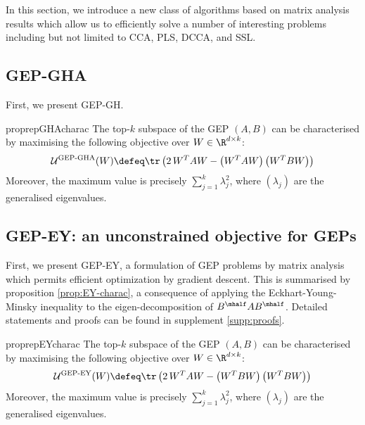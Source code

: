 In this section, we introduce a new class of algorithms based on matrix analysis results which allow us to efficiently solve a number of interesting problems including but not limited to CCA, PLS, DCCA, and SSL.

\subsection{GEP-GHA}
First, we present GEP-GH.

\begin{restatable}{proprep}{GHAcharac}
    \label{prop:GHA-charac}
    The top-$k$ subspace of the GEP $(A,B)$ can be characterised by maximising the following objective over $W \in \R^{d \times k}$:
    \begin{align}
        \mathcal{U}^\text{GEP-GHA}(W) \defeq \tr \left( 2\, W^T A W - \left(W^T A W\right) \left(W^T B W\right) \right)
    \end{align}
    Moreover, the maximum value is precisely $\sum_{j=1}^k \lambda_j^2$, where $(\lambda_j)$ are the generalised eigenvalues.
\end{restatable}

\subsection{GEP-EY: an unconstrained objective for GEPs}

First, we present GEP-EY, a formulation of GEP problems by matrix analysis which permits efficient optimization by gradient descent.
This is summarised by proposition \ref{prop:EY-charac}, a consequence of applying the Eckhart-Young-Minsky inequality \cite{stewart_matrix_1990} to the eigen-decomposition of $B^\mhalf A B^\mhalf$. Detailed statements and proofs can be found in supplement \ref{supp:proofs}.

\begin{restatable}{proprep}{EYcharac}
    \label{prop:EY-charac}
    The top-$k$ subspace of the GEP $(A,B)$ can be characterised by maximising the following objective over $W \in \R^{d \times k}$:
    \begin{align}
        \mathcal{U}^\text{GEP-EY}(W) \defeq \tr \left( 2\, W^T A W - \left(W^T B W\right) \left(W^T B W\right) \right)
    \end{align}
    Moreover, the maximum value is precisely $\sum_{j=1}^k \lambda_j^2$, where $(\lambda_j)$ are the generalised eigenvalues.
\end{restatable}

